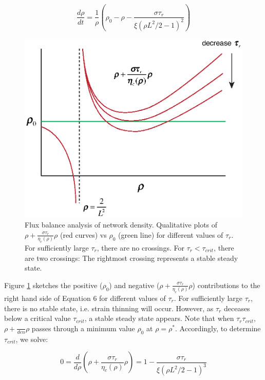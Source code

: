 \documentclass[10pt,letterpaper]{article}
\begin{document}
\begin{equation}
\label{drho_2}
\frac{d\rho}{dt}=\frac{1}{\rho}\left ( \rho_0 - \rho - \frac{\sigma \tau_r}{\xi(\rho L^2/2 -1)^2}\right )
\end{equation}

\begin{figure}[h!]
	\centering
	\includegraphics[width=\hsize]{figures/figureS1}
	\caption{\label{fig:flux_balance}  Flux balance analysis of network density. Qualitative plots of $\rho+\frac{\sigma \tau_r}{\eta_c(\rho)}\rho$ (red curves) vs $\rho_0$ (green line) for different values of $\tau_r$.  For sufficiently large $\tau_r$, there are no crossings.  For $\tau_r < \tau_{crit}$, there are two crossings:  The rightmost crossing represents a stable steady state.  }
\end{figure}


Figure \ref{fig:flux_balance} sketches the positive ($\rho_0$) and negative ($\rho+\frac{\sigma \tau_r}{\eta_c(\rho)}\rho$) contributions to the right hand side of Equation 6 for different values of $\tau_r$. For sufficiently large $\tau_r$, there is no stable state, i.e. strain thinning will occur.  However, as $\tau_r$ deceases below a critical value $\tau_{crit}$, a stable steady state appears.  Note that when $\tau_r  \tau_{crit}$, $\rho+\frac{}{den}\rho$ passes through a minimum value $\rho_0$ at $\rho=\rho^*$.  Accordingly, to determine $\tau_{crit}$, we solve:

\begin{equation}
\label{drho_3}
0 = \frac{d}{d\rho}\left( \rho + \frac{\sigma\tau_r}{\eta_c(\rho)} \rho\right ) = 1 - \frac{\sigma\tau_r}{\xi (\rho L^2/2-1)^3}
\end{equation}
\end{document}
